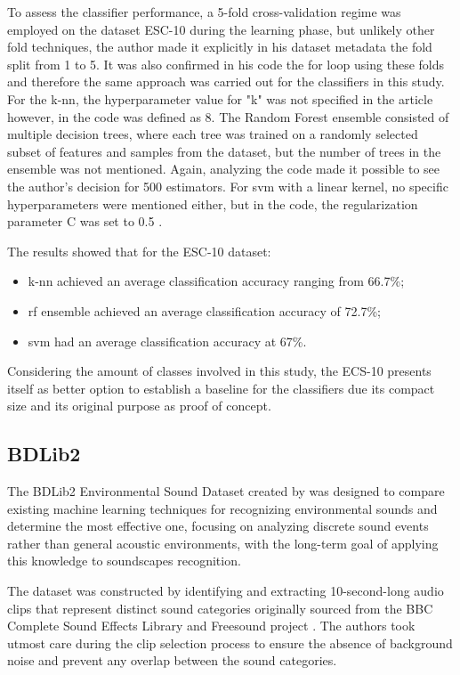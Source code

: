 To assess the classifier performance, a 5-fold cross-validation regime was employed on the dataset ESC-10 during the learning phase, but unlikely other fold techniques, the author made it explicitly in his dataset metadata the fold split from 1 to 5. It was also confirmed in his code the for loop using these folds and therefore the same approach was carried out for the classifiers in this study.
For the \gls{k-nn}, the hyperparameter value for "k" was not specified in the article however, in the code was defined as 8. The Random Forest ensemble consisted of multiple decision trees, where each tree was trained on a randomly selected subset of features and samples from the dataset, but the number of trees in the ensemble was not mentioned. Again, analyzing the code made it possible to see the author's decision for 500 estimators. For \gls{svm} with a linear kernel, no specific hyperparameters were mentioned either, but in the code, the regularization parameter C was set to 0.5 \cite{PiczakESC2015}.

The results showed that for the ESC-10 dataset: 
\begin{itemize}
    \item \gls{k-nn} achieved an average classification accuracy ranging from 66.7\%;
    \item \gls{rf} ensemble achieved an average classification accuracy of 72.7\%;
    \item \gls{svm} had an average classification accuracy at 67\%. 
\end{itemize}

Considering the amount of classes involved in this study, the ECS-10 presents itself as better option to establish a baseline for the classifiers due its compact size and its original purpose as proof of concept.

\subsection{BDLib2}
\label{subsec:dataset_BDLib2}

The BDLib2 Environmental Sound Dataset created by \textcite{Bountourakis2015} was designed to compare existing machine learning techniques for recognizing environmental sounds and determine the most effective one, focusing on analyzing discrete sound events rather than general acoustic environments, with the long-term goal of applying this knowledge to soundscapes recognition.

The dataset was constructed by identifying and extracting 10-second-long audio clips that represent distinct sound categories originally sourced from the BBC Complete Sound Effects Library \cite{BBC2023} and Freesound project \cite{Font_freesound2013}. The authors took utmost care during the clip selection process to ensure the absence of background noise and prevent any overlap between the sound categories.

